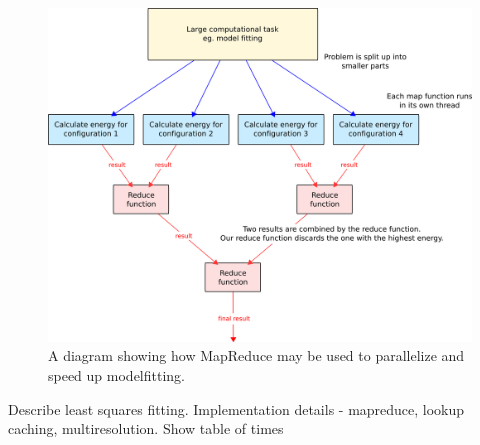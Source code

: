 \begin{figure}[tb]
	\centering
	\includegraphics[width=\textwidth]{mapreduce.png}
	\caption{A diagram showing how MapReduce may be used to parallelize and speed up modelfitting.}
	\label{MapReduceDiagram}
\end{figure}

Describe least squares fitting.
Implementation details - mapreduce, lookup caching, multiresolution.  Show table of times